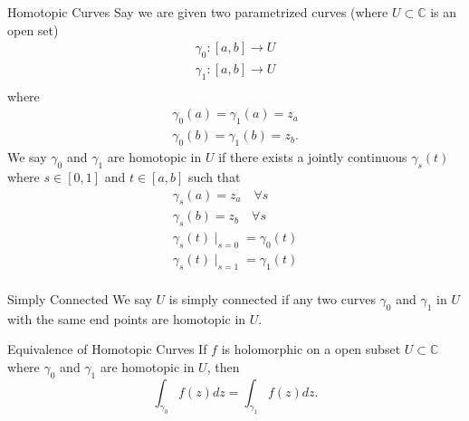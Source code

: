 \documentclass{article}
\begin{document}
                \begin{defn}{Homotopic Curves}{}
                Say we are given two parametrized curves (where \( U \subset \mathbb{C}  \) is an open set)
                \begin{align*}
                    \gamma _0: \left[ a,b \right] \to U \\
                    \gamma _1: \left[ a,b \right] \to U \\
                \end{align*}
                 where 
                \begin{align*}
                    \gamma _0(a) = \gamma_1(a) = z_a \\
                    \gamma _0(b) = \gamma _1(b) = z_b.
                \end{align*}
                We say \( \gamma _0  \) and \( \gamma _1 \) are homotopic in \( U \) if there exists a jointly continuous \( \gamma _s (t) \) where \( s \in [0, 1] \) and \( t \in \left[ a,b \right]  \) such that \begin{align*}
                    \gamma _s(a) = z_a \quad \forall s\\
                    \gamma _s(b) = z_b \quad \forall s\\
                    \gamma _s (t) \mid _{s = 0} = \gamma _0(t) \\
                    \gamma _s (t) \mid _{s = 1} = \gamma _1(t) \\
                \end{align*}
                
                \end{defn}
                \begin{defn}{Simply Connected}{}
                    We say \( U \) is simply connected if any two curves \( \gamma _0 \) and \( \gamma _1 \) in \( U \) with the same end points are homotopic in \( U \). 
                    \end{defn}

                    \begin{thrm}{Equivalence of Homotopic Curves}{}
                        If \( f \) is holomorphic on a open subset \( U \subset \mathbb{C}  \) where \( \gamma _0 \) and \( \gamma _1 \) are homotopic in \( U \), then 
                        \[
                            \int _{\gamma _0}f(z) dz = \int _{\gamma _1}f(z) dz.
                        \]
                        \end{thrm}
                        
\end{document}
